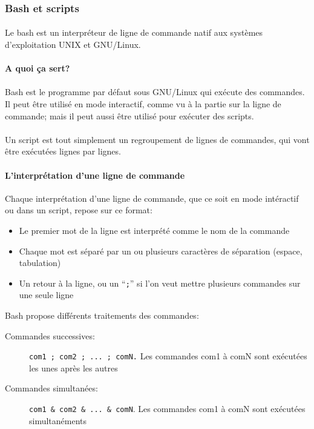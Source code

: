 \subsubsection{Bash et scripts}

\paragraph{} Le bash est un interpréteur de ligne de commande natif aux
systèmes d'exploitation UNIX et GNU/Linux.

\paragraph{A quoi ça sert?}

\paragraph{} Bash est le programme par défaut sous GNU/Linux qui exécute des
commandes. Il peut être utilisé en mode interactif, comme vu à la partie sur la
ligne de commande; mais il peut aussi être utilisé pour exécuter des scripts.

\paragraph{} Un script est tout simplement un regroupement de lignes de
commandes, qui vont être exécutées lignes par lignes.

\paragraph{L'interprétation d'une ligne de commande}

Chaque interprétation d'une ligne de commande, que ce soit en mode intéractif
ou dans un script, repose sur ce format:

\begin{itemize}
	\item Le premier mot de la ligne est interprété comme le nom de la commande
	\item Chaque mot est séparé par un ou plusieurs caractères de séparation
		(espace, tabulation)
	\item Un retour à la ligne, ou un ``\texttt{;}'' si l'on veut mettre
		plusieurs commandes sur une seule ligne
\end{itemize}

Bash propose différents traitements des commandes:
\begin{description}
	\item[Commandes successives:] \texttt{com1 ; com2 ; ... ; comN.}
		Les commandes com1 à comN sont exécutées les unes après les autres
	\item[Commandes simultanées:] \texttt{com1 & com2 & ...  & comN}.
		Les commandes com1 à comN sont exécutées simultanéments
\end{description}

